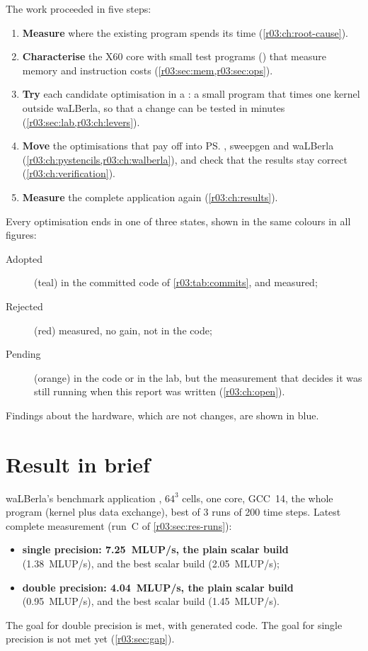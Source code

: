 The work proceeded in five steps:
\begin{enumerate}
  \item \textbf{Measure} where the existing program spends its time (\cref{r03:ch:root-cause}).
  \item \textbf{Characterise} the X60 core with small test programs () that
        measure memory and instruction costs (\cref{r03:sec:mem,r03:sec:ops}).
  \item \textbf{Try} each candidate optimisation in a : a small program
        that times one kernel outside waLBerla, so that a change can be tested in minutes
        (\cref{r03:sec:lab,r03:ch:levers}).
  \item \textbf{Move} the optimisations that pay off into \ps{}, sweepgen and waLBerla
        (\cref{r03:ch:pystencils,r03:ch:walberla}), and check that the results stay
        correct (\cref{r03:ch:verification}).
  \item \textbf{Measure} the complete application again (\cref{r03:ch:results}).
\end{enumerate}

Every optimisation ends in one of three states, shown in the same colours in all figures:
\begin{description}
  \item[Adopted] (teal) in the committed code of \cref{r03:tab:commits}, and measured;
  \item[Rejected] (red) measured, no gain, not in the code;
  \item[Pending] (orange) in the code or in the lab, but the measurement that decides it was
        still running when this report was written (\cref{r03:ch:open}).
\end{description}
Findings about the hardware, which are not changes, are shown in blue.

\section{Result in brief}\label{r03:sec:brief}

\begin{keyidea}
waLBerla's benchmark application , $64^3$ cells, one core, GCC~14, the
whole program (kernel plus data exchange), best of 3 runs of 200 time steps. Latest complete
measurement (run~C of \cref{r03:sec:res-runs}):
\begin{itemize}
  \item \textbf{single precision: 7.25~MLUP/s,  the plain scalar build}
        (1.38~MLUP/s), and  the best scalar build (2.05~MLUP/s);
  \item \textbf{double precision: 4.04~MLUP/s,  the plain scalar build}
        (0.95~MLUP/s), and  the best scalar build (1.45~MLUP/s).
\end{itemize}
The  goal for double precision is met, with generated code. The  goal for single
precision is not met yet (\cref{r03:sec:gap}).
\end{keyidea}

